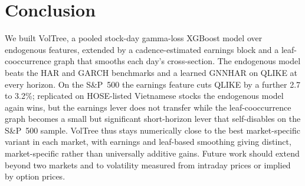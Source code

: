 \documentclass[runningheads,a4paper]{llncs}
\begin{document}
\section{Conclusion}
We built VolTree, a pooled stock-day gamma-loss XGBoost model over endogenous features, extended by a
cadence-estimated earnings block and a leaf-cooccurrence graph that smooths each day's cross-section. The
endogenous model beats the HAR and GARCH benchmarks and a learned GNNHAR on QLIKE at every horizon. On the
S\&P~500 the earnings feature cuts QLIKE by a further
2.7 to 3.2\%; replicated on HOSE-listed Vietnamese stocks the endogenous model again wins, but the earnings lever
does not transfer while the leaf-cooccurrence graph becomes a small but significant short-horizon lever that
self-disables on the S\&P~500 sample. VolTree thus stays numerically close to the best
market-specific variant in each market, with earnings and leaf-based smoothing giving distinct,
market-specific rather than universally additive gains. Future work should extend beyond two markets and to
volatility measured from intraday prices or implied by option prices.
\end{document}
